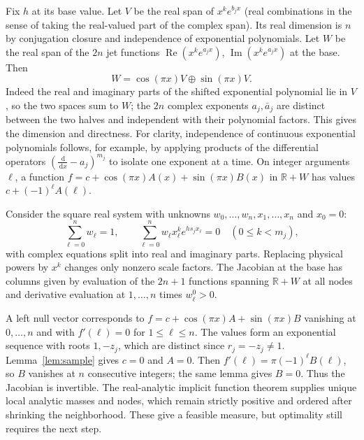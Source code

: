 \documentclass[11pt]{article}
\theoremstyle{remark}\newtheorem{remark}[theorem]{Remark}
\newcommand{\R}{\mathbb R}\newcommand{\C}{\mathbb C}\newcommand{\supp}{\operatorname{supp}}\newcommand{\diam}{\operatorname{diam}}\newcommand{\res}{\operatorname{Res}}\newcommand{\Ree}{\operatorname{Re}}\newcommand{\Imm}{\operatorname{Im}}\newcommand{\dd}{\,\mathrm d}
\begin{document}
Fix $h$ at its base value. Let $V$ be the real span of $x^k e^{b_jx}$ (real combinations in the sense of taking the real-valued part of the complex span). Its real dimension is $n$ by conjugation closure and independence of exponential polynomials. Let $W$ be the real span of the $2n$ jet functions $\Ree(x^ke^{a_jx})$, $\Imm(x^ke^{a_jx})$ at the base. Then
\begin{equation}\label{eq:decomposition}
 W=\cos(\pi x)V\oplus\sin(\pi x)V.
\end{equation}
Indeed the real and imaginary parts of the shifted exponential polynomial lie in $V$, so the two spaces sum to $W$; the $2n$ complex exponents $a_j,\bar a_j$ are distinct between the two halves and independent with their polynomial factors. This gives the dimension and directness. For clarity, independence of continuous exponential polynomials follows, for example, by applying products of the differential operators $(\frac{\dd}{\dd x}-a_j)^{m_j}$ to isolate one exponent at a time. On integer arguments $\ell$, a function $f=c+\cos(\pi x)A(x)+\sin(\pi x)B(x)$ in $\R+W$ has values $c+(-1)^\ell A(\ell)$.

Consider the square real system with unknowns $w_0,\ldots,w_n,x_1,\ldots,x_n$ and $x_0=0$:
\begin{equation}\label{eq:system}
 \sum_{\ell=0}^n w_\ell=1,\qquad
 \sum_{\ell=0}^n w_\ell x_\ell^k e^{hs_jx_\ell}=0\quad(0\le k<m_j),
\end{equation}
with complex equations split into real and imaginary parts. Replacing physical powers by $x^k$ changes only nonzero scale factors. The Jacobian at the base has columns given by evaluation of the $2n+1$ functions spanning $\R+W$ at all nodes and derivative evaluation at $1,\ldots,n$ times $w_\ell^0>0$.

A left null vector corresponds to $f=c+\cos(\pi x)A+\sin(\pi x)B$ vanishing at $0,\ldots,n$ and with $f'(\ell)=0$ for $1\le\ell\le n$. The values form an exponential sequence with roots $1,-z_j$, which are distinct since $r_j=-z_j\ne1$. Lemma~\ref{lem:sample} gives $c=0$ and $A=0$. Then $f'(\ell)=\pi(-1)^\ell B(\ell)$, so $B$ vanishes at $n$ consecutive integers; the same lemma gives $B=0$. Thus the Jacobian is invertible. The real-analytic implicit function theorem supplies unique local analytic masses and nodes, which remain strictly positive and ordered after shrinking the neighborhood. These give a feasible measure, but optimality still requires the next step.
\end{document}
